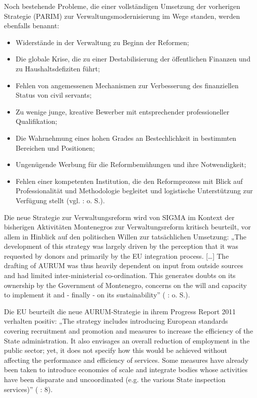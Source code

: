 Noch bestehende Probleme, die einer vollständigen Umsetzung der vorherigen Strategie (PARIM) zur Verwaltungsmodernisierung im Wege standen, werden ebenfalls benannt:
\begin{itemize} \itemsep1pt \parskip0pt 
\item Widerstände in der Verwaltung zu Beginn der Reformen;
\item Die globale Krise, die zu einer Destabilisierung der öffentlichen Finanzen und zu Haushaltsdefiziten führt;
\item Fehlen von angemessenen Mechanismen zur Verbesserung des finanziellen Status von civil servants;
\item Zu wenige junge, kreative Bewerber mit entsprechender professioneller Qualifikation;
\item Die Wahrnehmung eines hohen Grades an Bestechlichkeit in bestimmten Bereichen und Positionen;
\item Ungenügende Werbung für die Reformbemühungen und ihre Notwendigkeit;
\item Fehlen einer kompetenten Institution, die den Reformprozess mit Blick auf Professionalität und Methodologie begleitet und logistische Unterstützung zur Verfügung stellt (vgl. \cite{govmont11} : o. S.).
\end{itemize}
Die neue Strategie zur Verwaltungsreform wird von SIGMA im Kontext der bisherigen Aktivitäten Montenegros zur Verwaltungsreform kritisch beurteilt, vor allem in Hinblick auf den politischen Willen zur tatsächlichen Umsetzung: „The development of this strategy was largely driven by the perception that it was requested by donors and primarily by the EU integration process. […] The drafting of AURUM was thus heavily dependent on input from outside sources and had limited inter-ministerial co-ordination. This generates doubts on its ownership by the Government of Montenegro, concerns on the will and capacity to implement it and - finally - on its sustainability” ( \cite{oecd11a} :  o. S.).
\par
Die EU beurteilt die neue AURUM-Strategie in ihrem Progress Report 2011 verhalten positiv: „The strategy includes introducing European standards covering recruitment and promotion and measures to increase the efficiency of the State administration. It also envisages an overall reduction of employment in the public sector; yet, it does not specify how this would be achieved without affecting the performance and efficiency of services. Some measures have already been taken to introduce economies of scale and integrate bodies whose activities have been disparate and uncoordinated (e.g. the various State inspection services)” (\cite{eurcom11c} : 8).\par
